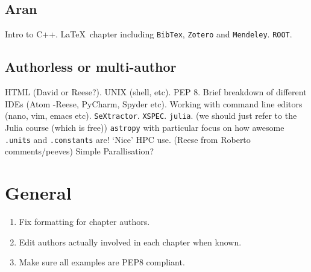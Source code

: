 \subsection*{Aran}

\begin{itemize}
	
\pybullet \color{blue}Intro to C++.
\pybullet \LaTeX\ chapter including \texttt{BibTex}, \texttt{Zotero} and \texttt{Mendeley}. \color{black}
\pybullet \color{red}\texttt{ROOT}. \color{black}
	
\end{itemize}

\subsection*{Authorless or multi-author}

\begin{itemize}
	
\pybullet \color{blue}HTML (David or Reese?).
\pybullet UNIX (shell, etc).\color{black}
\pybullet \color{red} PEP 8. \color{black}
\pybullet \color{red} Brief breakdown of different IDEs (Atom -Reese, PyCharm, Spyder etc). \color{black}
\pybullet \color{red} Working with command line editors (nano, vim, emacs etc). \color{black}
\pybullet \color{red} \texttt{SeXtractor}. \color{black}
\pybullet \color{red}\texttt{XSPEC}. \color{black}
\pybullet \color{red} \texttt{julia}. \color{black} (we should just refer to the Julia course (which is free))
\pybullet \color{red} \texttt{astropy} with particular focus on how awesome \texttt{.units} and \texttt{.constants} are! \color{black}
\pybullet \color{red} `Nice' HPC use. \color{black} (Reese from Roberto comments/peeves)
\pybullet \color{red} Simple Parallisation? \color{black}
	
\end{itemize}

\newpage

\section*{General}

\begin{enumerate}
    \item Fix formatting for chapter authors.
    \item Edit authors actually involved in each chapter when known.
    \item Make sure all examples are PEP8 compliant.
\end{enumerate}


